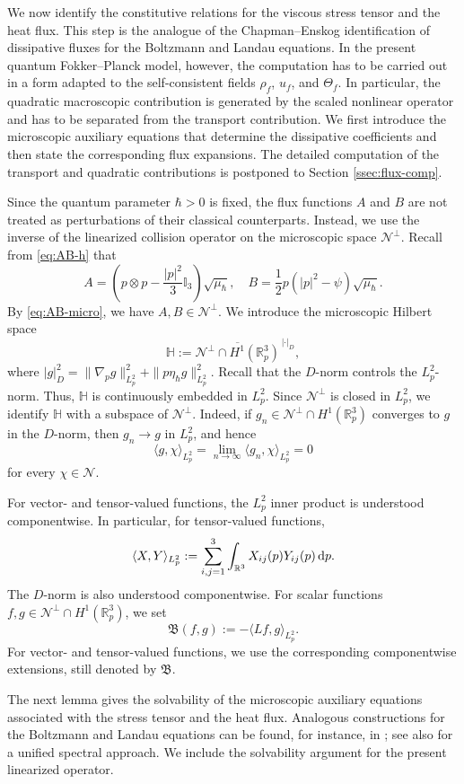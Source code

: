 \documentclass[10pt,reqno]{amsart}
\numberwithin{equation}{section}
\newcommand{\lt}{\left}
\newcommand{\rt}{\right}
\newcommand{\lal}{\langle}
\newcommand{\ral}{\rangle}
\newcommand{\mR}{\mathbb{R}}
\newcommand{\intr}{\int_{\mR^3}}
\newcommand{\R}{\mathbb R}
\newcommand{\calN}{\mathcal N}
\newcommand{\rdp}{\textnormal{d}p}
\begin{document}
 
 
We now identify the constitutive relations for the viscous stress tensor and the heat flux. This step is the analogue of the Chapman--Enskog identification of dissipative fluxes for the Boltzmann and Landau equations. In the present quantum Fokker--Planck model, however, the computation has to be carried out in a form adapted to the self-consistent fields $\rho_f$, $u_f$, and $\Theta_f$. In particular, the quadratic macroscopic contribution is generated by the scaled nonlinear operator and has to be separated from the transport contribution. We first introduce the microscopic auxiliary equations that determine the dissipative coefficients and then state the corresponding flux expansions. The detailed computation of the transport and quadratic contributions is postponed to Section \ref{ssec:flux-comp}.

Since the quantum parameter $\hbar>0$ is fixed, the flux functions $A $ and $B $ are not treated as perturbations of their classical counterparts. Instead, we use the inverse of the linearized collision operator on the microscopic space $\calN^\perp$. Recall from \eqref{eq:AB-h} that
\[
A =\lt(p\otimes p-\frac{|p|^2}{3}\mathbb I_3\rt)\sqrt{\mu_\hbar}, \quad B =\frac{1}{2}p\lt(|p|^2-\psi \rt)\sqrt{\mu_\hbar}.
\]
By \eqref{eq:AB-micro}, we have $A ,B \in\calN^\perp$. We introduce the microscopic Hilbert space
\[
\mathbb{H} := \overline{ \calN^\perp \cap H^1(\R^3_p) }^{\,|\cdot|_{D }},
\]
where $|g|_{D }^2 = \|\nabla_pg\|_{L^2_p}^2 + \|p\eta_\hbar g\|_{L^2_p}^2$. Recall that the $D $-norm controls the $L^2_p$-norm. Thus, $\mathbb{H}$ is continuously embedded in $L^2_p$. Since $\calN^\perp$ is closed in $L^2_p$, we identify $\mathbb{H}$ with a subspace of $\calN^\perp$. Indeed, if $g_n\in\calN^\perp\cap H^1(\R^3_p)$ converges to $g$ in the $D$-norm, then $g_n\to g$ in $L^2_p$, and hence
\[
\lal g,\chi\ral_{L^2_p} = \lim_{n\to\infty}\lal g_n,\chi\ral_{L^2_p} =0
\]
for every $\chi\in\calN$.

For vector- and tensor-valued functions, the $L^2_p$ inner product is understood componentwise. In particular, for tensor-valued functions,
\[
\lal X,Y\ral_{L^2_p}:=\sum_{i,j=1}^3\intr X_{ij}(p)Y_{ij}(p)\,\rdp.
\]
The $D$-norm is also understood componentwise. For scalar functions $f,g\in\calN^\perp\cap H^1(\R^3_p)$, we set
\[
\mathfrak{B}(f,g):=-\lal Lf,g\ral_{L^2_p}.
\]
For vector- and tensor-valued functions, we use the corresponding componentwise extensions, still denoted by $\mathfrak{B}$.

The next lemma gives the solvability of the microscopic auxiliary equations associated with the stress tensor and the heat flux. Analogous constructions for the Boltzmann and Landau equations can be found, for instance, in \cite{GS04,Rac21,JXZ22}; see also \cite{GL24} for a unified spectral approach. We include the solvability argument for the present linearized operator.
 
\end{document}
